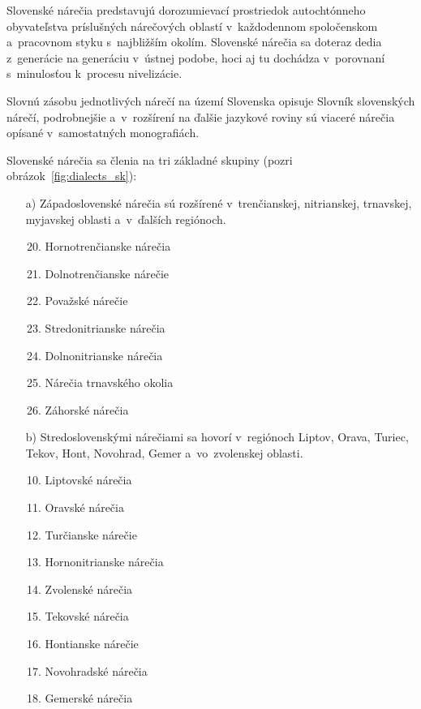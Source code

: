 \noindent Slovenské nárečia predstavujú dorozumievací prostriedok autochtónneho obyvateľstva príslušných nárečových oblastí v~každodennom spoločenskom a~pracovnom styku s~najbližším okolím. Slovenské nárečia sa doteraz dedia z~generácie na generáciu v~ústnej podobe, hoci aj tu dochádza v~porovnaní s~minulosťou k~procesu nivelizácie.

Slovnú zásobu jednotlivých nárečí na území Slovenska opisuje Slovník slovenských nárečí, podrobnejšie a~v~rozšírení na ďalšie jazykové roviny sú viaceré nárečia opísané v~samostatných monografiách.

Slovenské nárečia sa členia na tri základné skupiny (pozri obrázok~\ref{fig:dialects_sk}):

\begin{itemize}
\item[a)] Západoslovenské nárečia sú rozšírené v~trenčianskej, nitrianskej, trnavskej, myjavskej oblasti a~v~ďalších regiónoch.

\begin{enumerate}
\setcounter{enumi}{19}
\item Hornotrenčianske nárečia
\item Dolnotrenčianske nárečie
\item Považské nárečie 
\item Stredonitrianske nárečia 
\item Dolnonitrianske nárečia 
\item Nárečia trnavského okolia
\item Záhorské nárečia 
\end{enumerate}

\item[b)] Stredoslovenskými nárečiami sa hovorí v~regiónoch Liptov, Orava, Turiec, Tekov, Hont, Novohrad, Gemer a~vo~zvolenskej oblasti.

\begin{enumerate}
\setcounter{enumi}{9}
\item Liptovské nárečia
\item Oravské nárečia
\item Turčianske nárečie
\item Hornonitrianske nárečia
\item Zvolenské nárečia
\item Tekovské nárečia
\item Hontianske nárečie
\item Novohradské nárečia
\item Gemerské nárečia
\end{enumerate}


\end{itemize}
